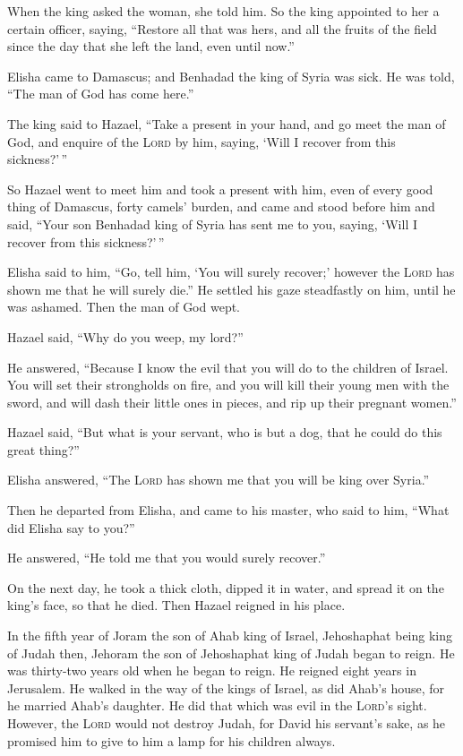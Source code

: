  When the king asked the woman, she told him. So the king
appointed to her a certain officer, saying, ``Restore all that was hers,
and all the fruits of the field since the day that she left the land,
even until now.''

 Elisha came to Damascus; and Benhadad the king of Syria
was sick. He was told, ``The man of God has come here.''

 The king said to Hazael, ``Take a present in your hand,
and go meet the man of God, and enquire of the \textsc{Lord} by him,
saying, `Will I recover from this sickness?'\,''

 So Hazael went to meet him and took a present with him,
even of every good thing of Damascus, forty camels' burden, and came and
stood before him and said, ``Your son Benhadad king of Syria has sent me
to you, saying, `Will I recover from this sickness?'\,''

 Elisha said to him, ``Go, tell him, `You will surely
recover;' however the \textsc{Lord} has shown me that he will surely
die.''  He settled his gaze steadfastly on him, until he
was ashamed. Then the man of God wept.

 Hazael said, ``Why do you weep, my lord?''

He answered, ``Because I know the evil that you will do to the children
of Israel. You will set their strongholds on fire, and you will kill
their young men with the sword, and will dash their little ones in
pieces, and rip up their pregnant women.''

 Hazael said, ``But what is your servant, who is but a
dog, that he could do this great thing?''

Elisha answered, ``The \textsc{Lord} has shown me that you will be king
over Syria.''

 Then he departed from Elisha, and came to his master,
who said to him, ``What did Elisha say to you?''

He answered, ``He told me that you would surely recover.''

 On the next day, he took a thick cloth, dipped it in
water, and spread it on the king's face, so that he died. Then Hazael
reigned in his place.

 In the fifth year of Joram the son of Ahab king of
Israel, Jehoshaphat being king of Judah then, Jehoram the son of
Jehoshaphat king of Judah began to reign.  He was
thirty-two years old when he began to reign. He reigned eight years in
Jerusalem.  He walked in the way of the kings of Israel,
as did Ahab's house, for he married Ahab's daughter. He did that which
was evil in the \textsc{Lord}'s sight.  However, the
\textsc{Lord} would not destroy Judah, for David his servant's sake, as
he promised him to give to him a lamp for his children always.

